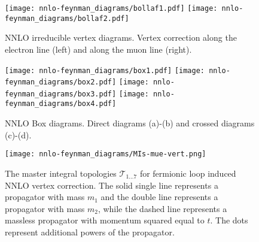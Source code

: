 \documentclass[Physsubmission, Phys]{SciPost}
\begin{document}
\begin{figure}[hbtp]
        \begin{center}
          \texttt{[image: nnlo-feynman\_diagrams/bollaf1.pdf]}\hspace{0.5cm}
          \texttt{[image: nnlo-feynman\_diagrams/bollaf2.pdf]}
        \caption{
          NNLO irreducible vertex diagrams. Vertex correction
          along the electron line (left) and along the muon line (right).}
\label{Fig:irred-vert}
\end{center}
\end{figure}

\begin{figure}[hbtp]
        \begin{center}
          \texttt{[image: nnlo-feynman\_diagrams/box1.pdf]}\hspace{0.1cm}
          \texttt{[image: nnlo-feynman\_diagrams/box2.pdf]}\hspace{0.1cm}
          \texttt{[image: nnlo-feynman\_diagrams/box3.pdf]}\hspace{0.1cm}
          \texttt{[image: nnlo-feynman\_diagrams/box4.pdf]}
        \caption{
          NNLO Box diagrams. Direct diagrams (a)-(b) and 
          crossed diagrams (c)-(d).}
\label{Fig:irred-box}
\end{center}
\end{figure}

\begin{figure}[hbtp]
\begin{center}
\texttt{[image: nnlo-feynman\_diagrams/MIs-mue-vert.png]}
\end{center}
\caption{The master integral topologies $\mathcal{T}_{1\dots7}$ for
   fermionic loop induced NNLO vertex correction.  The solid single
   line represents a propagator with mass $m_1$ and the double line
   represents a propagator with mass $m_2$, while the dashed line
   represents a massless propagator with momentum squared equal to
   $t$. The dots represent additional powers of the propagator. }
\label{fig:MIs}
\end{figure}
\end{document}
